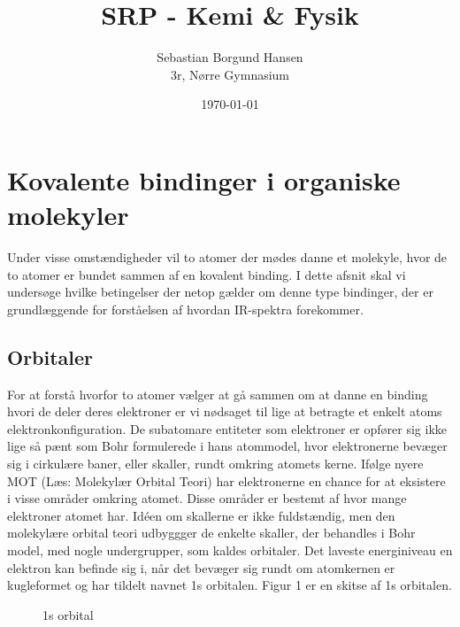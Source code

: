 \documentclass[12pt,a4paper]{article}
\author{Sebastian Borgund Hansen \\ 3r, Nørre Gymnasium}
\title{SRP - Kemi \& Fysik}
\date{\today}
\theoremstyle{break}
\theoremstyle{nonumberplain}
\begin{document}
\maketitle
\section{Kovalente bindinger i organiske molekyler}

Under visse omstændigheder vil to atomer der mødes danne et molekyle, hvor de to atomer er bundet sammen af en kovalent binding. I dette afsnit skal vi undersøge hvilke betingelser der netop gælder om denne type bindinger, der er grundlæggende for forståelsen af hvordan IR-spektra forekommer.

\subsection{Orbitaler}
For at forstå hvorfor to atomer vælger at gå sammen om at danne en binding hvori de deler deres elektroner er vi nødsaget til lige at betragte et enkelt atoms elektronkonfiguration. De subatomare entiteter som elektroner er opfører sig ikke lige så pænt som Bohr formulerede i hans atommodel, hvor elektronerne bevæger sig i cirkulære baner, eller skaller, rundt omkring atomets kerne. Ifølge nyere MOT (Læs: Molekylær Orbital Teori) har elektronerne en chance for at eksistere i visse områder omkring atomet. Disse områder er bestemt af hvor mange elektroner atomet har. Idéen om skallerne er ikke fuldstændig, men den molekylære orbital teori udbyggger de enkelte skaller, der behandles i Bohr model, med nogle undergrupper, som kaldes orbitaler. Det laveste energiniveau en elektron kan befinde sig i, når det bevæger sig rundt om atomkernen er kugleformet og har tildelt navnet 1s orbitalen. Figur 1 er en skitse af 1s orbitalen. 

\begin{figure}[ht!]
  \centering
  \caption{1s orbital} \end{figure}
  
\end{document}
